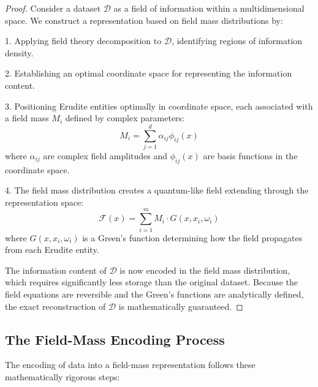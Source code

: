 \begin{proof}
Consider a dataset $\mathcal{D}$ as a field of information within a multidimensional space. We construct a representation based on field mass distributions by:

1. Applying field theory decomposition to $\mathcal{D}$, identifying regions of information density.

2. Establishing an optimal coordinate space for representing the information content.

3. Positioning Erudite entities optimally in coordinate space, each associated with a field mass $M_i$ defined by complex parameters:
\begin{equation}
M_i = \sum_{j=1}^d \alpha_{ij} \phi_{ij}(x)
\end{equation}
where $\alpha_{ij}$ are complex field amplitudes and $\phi_{ij}(x)$ are basis functions in the coordinate space.

4. The field mass distribution creates a quantum-like field extending through the representation space:
\begin{equation}
\mathcal{F}(x) = \sum_{i=1}^m M_i \cdot G(x, x_i, \omega_i)
\end{equation}
where $G(x, x_i, \omega_i)$ is a Green's function determining how the field propagates from each Erudite entity.

The information content of $\mathcal{D}$ is now encoded in the field mass distribution, which requires significantly less storage than the original dataset. Because the field equations are reversible and the Green's functions are analytically defined, the exact reconstruction of $\mathcal{D}$ is mathematically guaranteed.
\end{proof}

\subsection{The Field-Mass Encoding Process}

The encoding of data into a field-mass representation follows these mathematically rigorous steps:

